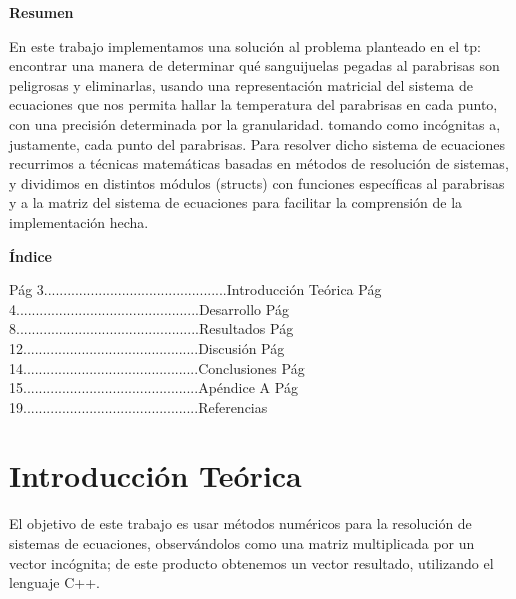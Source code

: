\documentclass[spanish,a4paper]{article}
\begin{document}
\LARGE \textbf{Resumen} \\
\normalsize

En este trabajo implementamos una solución al problema planteado en el tp: encontrar una manera de determinar qué sanguijuelas pegadas al parabrisas son peligrosas y eliminarlas, usando una representación matricial del sistema de ecuaciones que nos permita hallar la temperatura del parabrisas en cada punto, con una precisión determinada por la granularidad. tomando como incógnitas a, justamente, cada punto del parabrisas.\newline
Para resolver dicho sistema de ecuaciones recurrimos a técnicas matemáticas basadas en métodos de resolución de sistemas, y dividimos en distintos módulos (structs) con funciones específicas al parabrisas y a la matriz del sistema de ecuaciones para facilitar la comprensión de la implementación hecha.

\newpage

\LARGE \textbf{Índice}
\normalsize

\flushleft

Pág  3...............................................Introducción Teórica\newline \newline 
Pág  4...............................................Desarrollo\newline \newline
Pág  8...............................................Resultados\newline \newline
Pág 12.............................................Discusión\newline \newline
Pág 14.............................................Conclusiones\newline \newline
Pág 15.............................................Apéndice A\newline \newline
Pág 19.............................................Referencias


\newpage

\section{Introducci\'{o}n Te\'{o}rica}
\label{sec:intro}

El objetivo de este trabajo es usar métodos numéricos para la resolución de sistemas de ecuaciones, observándolos como una matriz multiplicada por un vector incógnita; de este producto obtenemos un vector resultado, utilizando el lenguaje C++.
\end{document}

